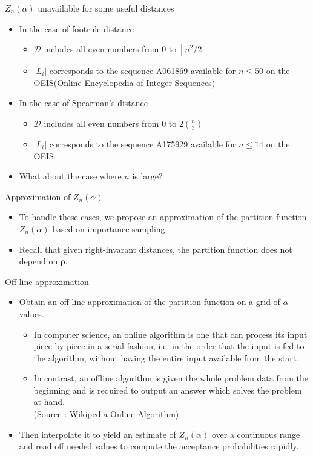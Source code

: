 \documentclass[11pt]{beamer}
\newcommand{\floor}[1]{\left\lfloor #1 \right\rfloor}
\begin{document}
\begin{frame}{$Z_n(\alpha)$ unavailable for some useful distances}
\begin{itemize}
    \item In the case of footrule distance
    \begin{itemize}
        \item $\mathcal{D}$ includes all even numbers from $0$ to $\floor{n^2/2}$
        \item $|L_i|$ corresponds to the sequence A061869 available for $n\leq 50$ on the OEIS(Online Encyclopedia of Integer Sequences)
    \end{itemize}
    \item In the case of Spearman's distance
    \begin{itemize}
        \item $\mathcal{D}$ includes all even numbers from $0$ to $2\binom{n}{3}$
        \item $|L_i|$ corresponds to the sequence A175929 available for $n\leq 14$ on the OEIS
    \end{itemize}
    \item What about the case where $n$ is large?
\end{itemize}
\end{frame}

\begin{frame}{Approximation of $Z_n(\alpha)$}
\begin{itemize}
    \item To handle these cases, we propose an approximation of the partition function $Z_n(\alpha)$ based on importance sampling. 
    \item Recall that given right-invarant distances, the partition function does not depend on $\boldsymbol{\rho}$. 
\end{itemize}
\end{frame}

\begin{frame}{Off-line approximation}
\begin{itemize}
    \item Obtain an off-line approximation of the partition function on a grid of $\alpha$ values. 
    \begin{itemize}
        \item In computer science, an online algorithm is one that can process its input piece-by-piece in a serial fashion, i.e. in the order that the input is fed to the algorithm, without having the entire input available from the start.
        \item In contrast, an offline algorithm is given the whole problem data from the beginning and is required to output an answer which solves the problem at hand. \\ (Source : Wikipedia \href{https://en.wikipedia.org/wiki/Online_algorithm}{Online Algorithm})
    \end{itemize}
    \item Then interpolate it to yield an estimate of $Z_n(\alpha)$ over a continuous range and read off needed values to compute the acceptance probabilities rapidly.
\end{itemize}
\end{frame}
\end{document}
